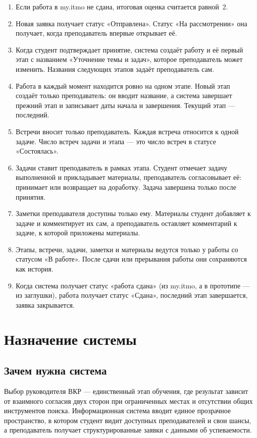 \documentclass[a4paper,12pt]{article}
\begin{document}
\begin{enumerate}[label=R\arabic*.]
  \item Если работа в my.itmo не сдана, итоговая оценка считается равной~2.
  \item Новая заявка получает статус «Отправлена». Статус «На рассмотрении» она получает, когда преподаватель впервые открывает её.
  \item Когда студент подтверждает принятие, система создаёт работу и её первый этап с названием «Уточнение темы и задач», которое преподаватель может изменить. Названия следующих этапов задаёт преподаватель сам.
  \item Работа в каждый момент находится ровно на одном этапе. Новый этап создаёт только преподаватель: он вводит название, а система завершает прежний этап и записывает даты начала и завершения. Текущий этап — последний.
  \item Встречи вносит только преподаватель. Каждая встреча относится к одной задаче. Число встреч задачи и этапа — это число встреч в статусе «Состоялась».
  \item Задачи ставит преподаватель в рамках этапа. Студент отмечает задачу выполненной и прикладывает материалы, преподаватель согласовывает её: принимает или возвращает на доработку. Задача завершена только после принятия.
  \item Заметки преподавателя доступны только ему. Материалы студент добавляет к задаче и комментирует их сам, а преподаватель оставляет комментарий к задаче, к которой приложены материалы.
  \item Этапы, встречи, задачи, заметки и материалы ведутся только у работы со статусом «В работе». После сдачи или прерывания работы они сохраняются как история.
  \item Когда система получает статус «работа сдана» (из my.itmo, а в прототипе — из заглушки), работа получает статус «Сдана», последний этап завершается, заявка закрывается.
\end{enumerate}

\section{Назначение системы}

\subsection{Зачем нужна система}
Выбор руководителя ВКР — единственный этап обучения, где результат зависит от взаимного согласия двух сторон при ограниченных местах и отсутствии общих инструментов поиска. Информационная система вводит единое прозрачное пространство, в котором студент видит доступных преподавателей и свои шансы, а преподаватель получает структурированные заявки с данными об успеваемости.
\end{document}
